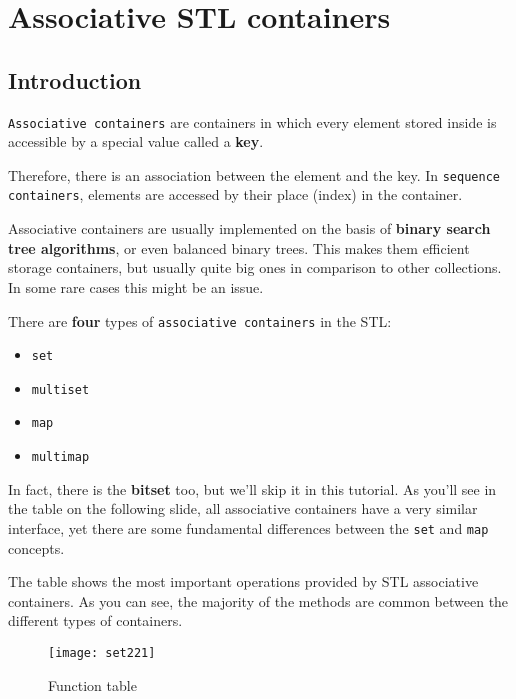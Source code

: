 \chapter{Associative STL containers} 
\graphicspath{{./Chapter2/Figs/}}

\section{Introduction} %
\texttt{Associative containers} are containers in which every element stored inside is accessible 
by a special value called a \textbf{key}.

Therefore, there is an association between the element and the key. In \texttt{sequence containers}, elements 
are accessed by their place (index) in the container.

Associative containers are usually implemented on the basis of \textbf{binary search tree algorithms}, 
or even balanced binary trees. This makes them efficient storage containers, but usually quite big ones 
in comparison to other collections. In some rare cases this might be an issue.

There are \textbf{four} types of \texttt{associative containers} in the STL:
\begin{itemize}
  \item \texttt{set}
  \item \texttt{multiset}
  \item \texttt{map}
  \item \texttt{multimap}
\end{itemize}
In fact, there is the \textbf{bitset} too, but we’ll skip it in this tutorial. As you’ll see in the table on 
the following slide, all associative containers have a very similar interface, yet there are some 
fundamental differences between the \texttt{set} and \texttt{map} concepts.

The table shows the most important operations provided by STL associative containers. 
As you can see, the majority of the methods are common between the different types of containers.

\begin{figure}[htbp!]
  \centering
  \texttt{[image: set221]}
  \caption[function]{Function table}
  \label{fig:function set}
\end{figure}

